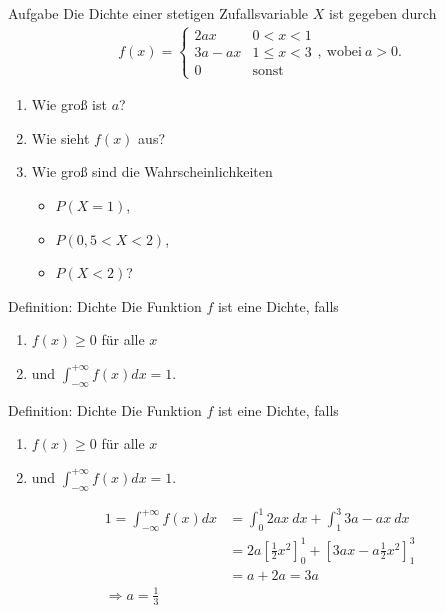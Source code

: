 \documentclass[t,11pt]{beamer}
\begin{document}
	\subtitle{}
	\logo{}
	\institute{}
	\date{}
	\subject{}

\addtocounter{framenumber}{-1}

\begin{frame}
	\begin{block}{Aufgabe}
		Die Dichte einer stetigen Zufallsvariable $X$ ist gegeben durch
		\begin{align*}
			f(x)=\begin{cases}
			2ax & 0<x<1\\
			3a-ax & 1\leq x <3 \\
			0 & \text{sonst}
			\end{cases},~\text{wobei}~a>0.
		\end{align*}
		\begin{enumerate}
			\item Wie groß ist $a$?
			\item Wie sieht $f(x)$ aus?
			\item Wie groß sind die Wahrscheinlichkeiten
			\begin{itemize}
				\item $P(X=1)$,
				\item $P(0,5<X<2)$,
				\item $P(X<2)$?
			\end{itemize}
		\end{enumerate}
	\end{block}
\end{frame}

\begin{frame}
	\begin{alertblock}{Definition: Dichte}
		Die Funktion $f$ ist eine Dichte, falls 
		\begin{enumerate}
			\item $f(x)\geq 0$ für alle $x$
			\item und $\int_{-\infty}^{+\infty} f(x)dx = 1$.
		\end{enumerate}
	\end{alertblock}
\end{frame}

\begin{frame}
\begin{alertblock}{Definition: Dichte}
	Die Funktion $f$ ist eine Dichte, falls 
	\begin{enumerate}
		\item $f(x)\geq 0$ für alle $x$
		\item und $\int_{-\infty}^{+\infty} f(x)dx = 1$.
	\end{enumerate}
\end{alertblock}
\begin{align*}
1 = \int_{-\infty}^{+\infty} f(x)dx &= \int_{0}^{1} 2ax~dx + \int_{1}^{3} 3a-ax~dx \\
&= 2a\left[ \frac{1}{2}x^2 \right]^1_0 + \left[ 3ax - a\frac{1}{2}x^2 \right]^3_1 \\
&= a + 2a = 3a \\
\Rightarrow a = \frac{1}{3}
\end{align*}
\end{frame}
\end{document}
